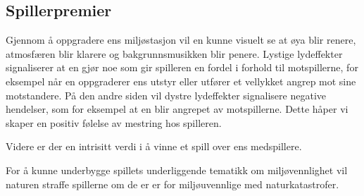 
\subsection{Spillerpremier}

Gjennom å oppgradere ens miljøstasjon vil en kunne visuelt se at øya blir renere, atmosfæren blir klarere og bakgrunnsmusikken blir penere. Lystige lydeffekter signaliserer at en gjør noe som gir spilleren en fordel i forhold til motspillerne, for eksempel når en oppgraderer ens utstyr eller utfører et vellykket angrep mot sine motstandere. På den andre siden vil dystre lydeffekter signalisere negative hendelser, som for eksempel at en blir angrepet av motspillerne. Dette håper vi skaper en positiv følelse av mestring hos spilleren. 

Videre er der en intrisitt verdi i å vinne et spill over ens medspillere.

For å kunne underbygge spillets underliggende tematikk om miljøvennlighet vil naturen straffe spillerne om de er er for miljøuvennlige med naturkatastrofer.